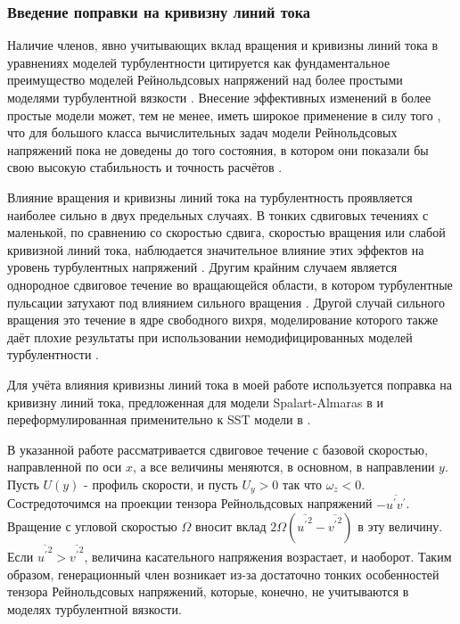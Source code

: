 	\subsubsection{Введение поправки на кривизну линий тока}
		\label{CC}
		Наличие членов, явно учитывающих вклад вращения и кривизны линий тока в уравнениях моделей турбулентности цитируется как фундаментальное преимущество моделей Рейнольдсовых напряжений над более простыми моделями турбулентной вязкости \cite{ShurSpallart}. Внесение эффективных изменений в более простые модели может, тем не менее, иметь широкое применение в силу того \cite{CC2}, что для большого класса вычислительных задач модели Рейнольдсовых напряжений пока не доведены до того состояния, в котором они показали бы свою высокую стабильность и точность расчётов \cite{CC3}.
		
		Влияние вращения и кривизны линий тока на турбулентность проявляется наиболее сильно в двух предельных случаях. В тонких сдвиговых течениях с маленькой, по сравнению со скоростью сдвига, скоростью вращения или слабой кривизной линий тока, наблюдается значительное влияние этих эффектов на уровень турбулентных напряжений \cite{Bradshaw}. Другим крайним случаем является однородное сдвиговое течение во вращающейся области, в котором турбулентные пульсации затухают под влиянием сильного вращения \cite{Speziale}. Другой случай сильного вращения это течение в ядре свободного вихря, моделирование которого также даёт плохие результаты при использовании немодифицированных моделей турбулентности \cite{Govindaraju}.
		
		Для учёта влияния кривизны линий тока в моей работе используется поправка на кривизну линий тока, предложенная для модели Spalart-Almaras в \cite{ShurSpallart} и переформулированная применительно к SST модели в \cite{Smirnov}.
		
		В указанной работе рассматривается сдвиговое течение с базовой скоростью, направленной по оси $x$, а все величины меняются, в основном, в направлении $y$. Пусть $U(y)$ - профиль скорости, и пусть $U_y > 0$ так что $\omega_z < 0$. Состредоточимся на проекции тензора Рейнольдсовых напряжений $-\overline{u^{'}v^{'}}$. Вращение с угловой скоростью $\Omega$ вносит вклад $2\Omega(\overline{{u^{'}}^2}-\overline{{v^{'}}^2})$ в эту величину. Если $\overline{{u^{'}}^2} > \overline{{v^{'}}^2}$, величина касательного напряжения возрастает, и наоборот. Таким образом, генерационный член возникает из-за достаточно тонких особенностей тензора Рейнольдсовых напряжений, которые, конечно, не учитываются в моделях турбулентной вязкости.
		
